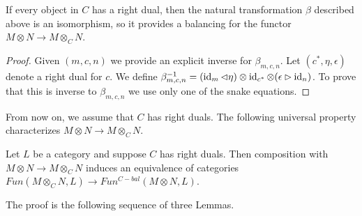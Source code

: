 \begin{lemma}\label{balanced}

If every object in $C$ has a right dual, then the natural transformation $\beta$ described above is an isomorphism, so it provides a balancing for the functor $M\otimes N\to M\otimes_C N$.\end{lemma}

\begin{proof} Given $(m,c,n)$ we provide an explicit inverse for $\beta_{m,c,n}$. Let $(c^*,\eta,\epsilon)$ denote a right dual for $c$. We define $\beta^{-1}_{m,c,n}=(\operatorname{id}_m\lhd\eta)\otimes\operatorname{id}_{c^*}\otimes (\epsilon\rhd\operatorname{id}_n)$. To prove that this is inverse to $\beta_{m,c,n}$ we use only one of the snake equations. \end{proof}

From now on, we assume that $C$ has right duals. The following universal property characterizes $M\otimes N \to M\otimes_C N$.

\begin{proposition}\label{univ_bal}

Let $L$ be a category and suppose $C$ has right duals. Then composition with $M\otimes N \to M\otimes_C N$ induces an equivalence of categories $Fun(M\otimes_C N,L)\to Fun^{C-bal}(M\otimes N,L)$.\end{proposition}

The proof is the following sequence of three Lemmas.


